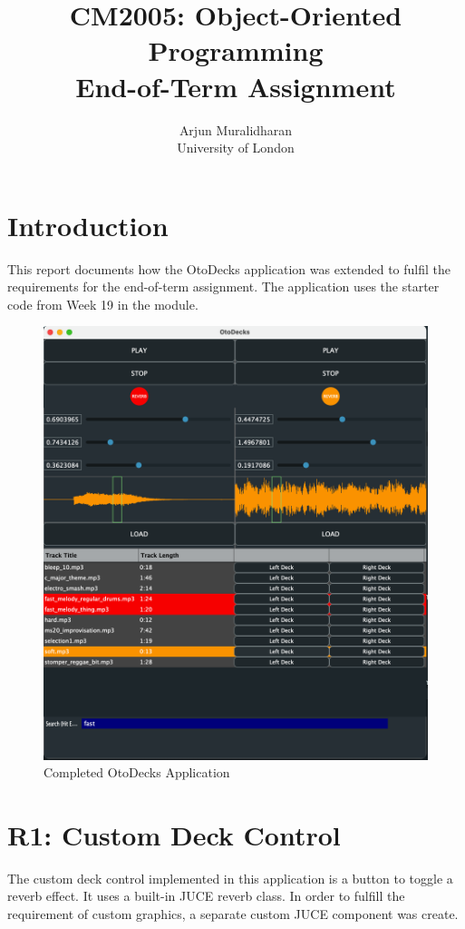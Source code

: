 
\title{CM2005: Object-Oriented Programming \\ End-of-Term Assignment}
\author{Arjun Muralidharan \\ University of London}



\section{Introduction}
This report documents how the OtoDecks application was extended to fulfil the requirements for the end-of-term assignment. The application uses the starter code from Week 19 in the module.

\begin{figure}[H]
	\centering
	\includegraphics[width=13cm]{fullapp.png}
	\caption{Completed OtoDecks Application}
	\label{endlibrary}
\end{figure}

\section{R1: Custom Deck Control}
The custom deck control implemented in this application is a button to toggle a reverb effect. It uses a built-in JUCE reverb class. In order to fulfill the requirement of custom graphics, a separate custom JUCE component was create.
